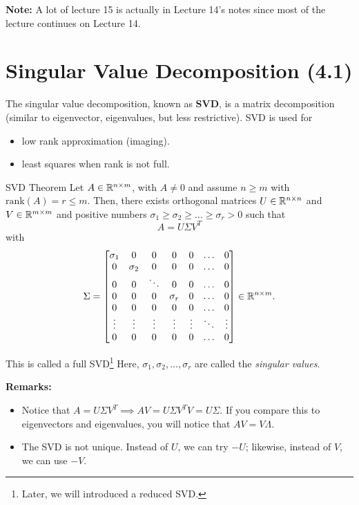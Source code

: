 \documentclass[letterpaper]{article}
\newcommand{\0}{\mathbf{0}}
\begin{document}
\textbf{Note:} A lot of lecture 15 is actually in Lecture 14's notes since most of the lecture continues on Lecture 14. 

\section{Singular Value Decomposition (4.1)}
The singular value decomposition, known as \textbf{SVD}, is a matrix decomposition (similar to eigenvector, eigenvalues, but less restrictive). SVD is used for 
\begin{itemize}
    \item low rank approximation (imaging).
    \item least squares when rank is not full. 
\end{itemize}

\begin{theorem}{SVD Theorem}{}
    Let $A \in \mathbb{R}^{n \times m}$, with $A \neq 0$ and assume $n \geq m$ with $\text{rank}(A) = r \leq m$. Then, there exists orthogonal matrices $U \in \mathbb{R}^{n \times n}$ and $V \in \mathbb{R}^{m \times m}$ and positive numbers $\sigma_1 \geq \sigma_2 \geq \hdots \geq \sigma_r > 0$ such that \[A = U \Sigma V^T\] with \[\Sigma = \begin{bmatrix}
        \sigma_1 & 0 & 0 & 0 & 0 & \hdots & 0 \\ 
        0 & \sigma_2 & 0 & 0 & 0 & \hdots & 0 \\ 
        0 & 0 & \ddots & 0 & 0 & \hdots & 0 \\ 
        0 & 0 & 0 & \sigma_r & 0 & \hdots & 0 \\ 
        0 & 0 & 0 & 0 & 0 & \hdots & 0 \\ 
        \vdots & \vdots & \vdots & \vdots & \vdots & \ddots & \vdots \\ 
        0 & 0 & 0 & 0 & 0 & \hdots & 0
    \end{bmatrix} \in \mathbb{R}^{n \times m}.\]
\end{theorem}
This is called a full SVD\footnote{Later, we will introduced a reduced SVD.} Here, $\sigma_1, \sigma_2, \hdots, \sigma_r$ are called the \emph{singular values}.

\textbf{Remarks:}
\begin{itemize}
    \item Notice that $A = U\Sigma V^T \implies AV = U\Sigma V^T V = U\Sigma$. If you compare this to eigenvectors and eigenvalues, you will notice that $AV = V\Lambda$. 
    
    \item The SVD is not unique. Instead of $U$, we can try $-U$; likewise, instead of $V$, we can use $-V$. 
\end{itemize}
\end{document}
